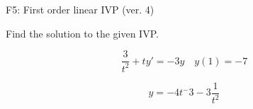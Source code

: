 \begin{exercise}
  \begin{exerciseTitle}F5: First order linear IVP (ver. 4)\end{exerciseTitle}
  \begin{exerciseStatement}
    
Find the solution to the given IVP.

    
\[\frac{3}{t^{2}} +ty'= -3 y \hspace{1em} y( 1 ) = -7\]

  \end{exerciseStatement}
  \begin{exerciseAnswer}
    
\[y= -4 t^ -3 -3 \frac{1}{t^{2}}\]

  \end{exerciseAnswer}
\end{exercise}